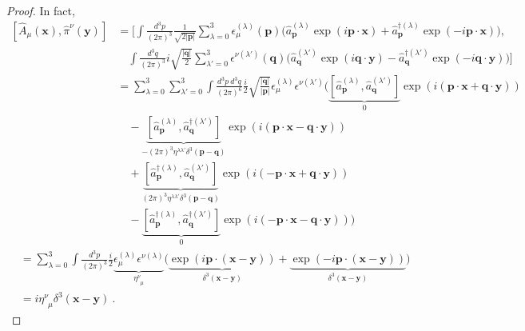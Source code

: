     \begin{proof}
        In fact, 
        \begin{equation*}
        \begin{aligned}
            [\hat A_\mu (\mathbf x), \hat \pi^\nu (\mathbf y)] & = [\int \frac{d^3 p}{(2\pi)^3} \frac{1}{\sqrt{2 |\mathbf p|}} \sum_{\lambda=0}^{3} \epsilon_\mu^{(\lambda)} (\mathbf p) \Big ( \hat a_{\mathbf p}^{(\lambda)} \exp(i \mathbf p \cdot \mathbf x) + \hat a_{\mathbf p}^{\dagger (\lambda)} \exp(- i \mathbf p \cdot \mathbf x) \Big), \\ & \quad \int \frac{d^3 q}{(2\pi)^3} i \sqrt{\frac{|\mathbf q|}{2}} \sum_{\lambda'=0}^{3} \epsilon^{\nu(\lambda')} (\mathbf q) \Big ( \hat a_{\mathbf q}^{(\lambda')}  \exp(i \mathbf q \cdot \mathbf y) - \hat a_{\mathbf q}^{\dagger (\lambda')} \exp(- i \mathbf q \cdot \mathbf y) \Big)] \\ & = \sum_{\lambda=0}^{3} \sum_{\lambda'=0}^{3} \int \frac{d^3 p ~ d^3 q}{(2\pi)^6} \frac{i}{2} \sqrt{\frac{|\mathbf q|}{|\mathbf p|}} \epsilon_\mu^{(\lambda)} \epsilon^{\nu(\lambda')} \Big ( \underbrace{[\hat a_{\mathbf p}^{(\lambda)} , \hat a_{\mathbf q}^{(\lambda')}]}_0 \exp(i (\mathbf p \cdot \mathbf x + \mathbf q \cdot \mathbf y)) \\ & \quad - \underbrace{[\hat a_{\mathbf p}^{(\lambda)} , \hat a_{\mathbf q}^{\dagger (\lambda')}]}_{- (2\pi)^3 \eta^{\lambda \lambda'} \delta^3 (\mathbf p - \mathbf q)} \exp(i (\mathbf p \cdot \mathbf x - \mathbf q \cdot \mathbf y)) \\ & \quad + \underbrace{[\hat a_{\mathbf p}^{\dagger (\lambda)} , \hat a_{\mathbf q}^{(\lambda')}]}_{(2\pi)^3 \eta^{\lambda \lambda'} \delta^3 (\mathbf p - \mathbf q)} \exp(i (- \mathbf p \cdot \mathbf x + \mathbf q \cdot \mathbf y)) \\ & \quad - \underbrace{[\hat a_{\mathbf p}^{\dagger(\lambda)} , \hat a_{\mathbf q}^{\dagger(\lambda')}]}_0 \exp(i (- \mathbf p \cdot \mathbf x - \mathbf q \cdot \mathbf y)) \Big)
        \end{aligned}
        \end{equation*}
        \begin{equation*}
        \begin{aligned}
            & = \sum_{\lambda=0}^{3} \int \frac{d^3 p}{(2\pi)^3} \frac{i}{2} \underbrace{\epsilon_\mu^{(\lambda)} \epsilon^{\nu(\lambda)}}_{\eta^\nu_{\phantom \nu \mu}} \Big ( \underbrace{\exp(i \mathbf p \cdot (\mathbf x - \mathbf y))}_{\delta^3 (\mathbf x - \mathbf y)} + \underbrace{\exp(- i \mathbf p \cdot (\mathbf x - \mathbf y))}_{\delta^3 (\mathbf x - \mathbf y)} \Big) \\ & = i \eta^\nu_{\phantom \nu \mu} \delta^3 (\mathbf x - \mathbf y) ~.
        \end{aligned}
        \end{equation*}
    \end{proof}

